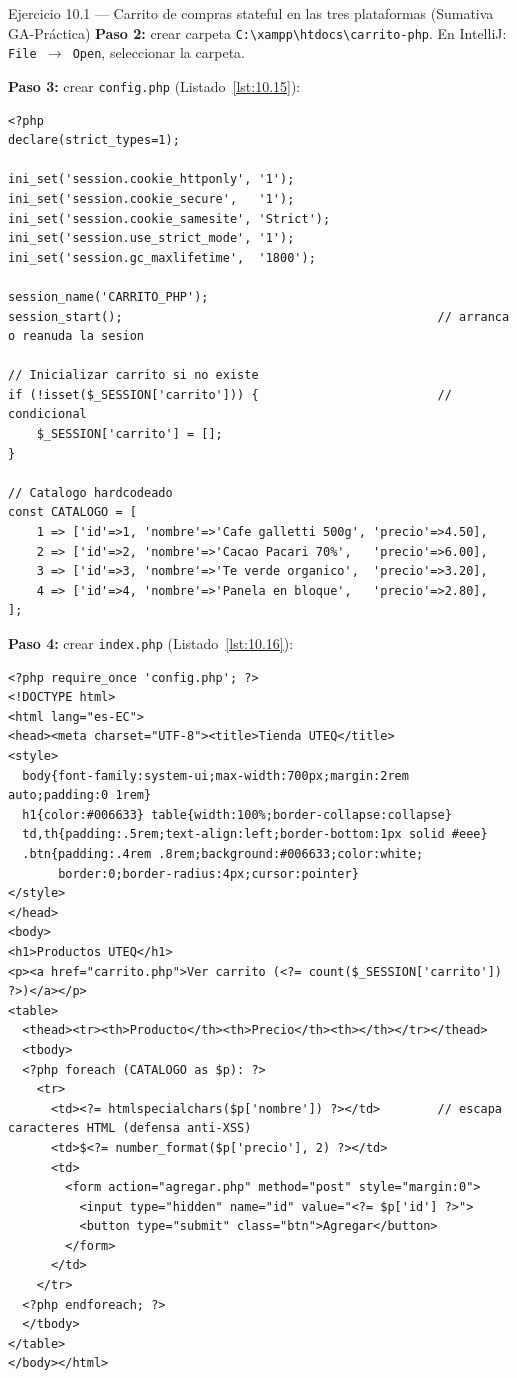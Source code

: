 \documentclass[11pt,a4paper,openany]{book}
\begin{document}
\begin{cajaejercicio}{Ejercicio 10.1 --- Carrito de compras stateful en las tres plataformas (Sumativa GA-Práctica)}
\textbf{Paso 2:} crear carpeta \texttt{C:\textbackslash{}xampp\textbackslash{}htdocs\textbackslash{}carrito-php}.
En IntelliJ: \texttt{File $\rightarrow$ Open}, seleccionar la carpeta.

\textbf{Paso 3:} crear \texttt{config.php} (Listado~\ref{lst:10.15}):

\begin{lstlisting}[style=php,caption={config.php},label=lst:10.15]
<?php
declare(strict_types=1);

ini_set('session.cookie_httponly', '1');
ini_set('session.cookie_secure',   '1');
ini_set('session.cookie_samesite', 'Strict');
ini_set('session.use_strict_mode', '1');
ini_set('session.gc_maxlifetime',  '1800');

session_name('CARRITO_PHP');
session_start();                                            // arranca o reanuda la sesion

// Inicializar carrito si no existe
if (!isset($_SESSION['carrito'])) {                         // condicional
    $_SESSION['carrito'] = [];
}

// Catalogo hardcodeado
const CATALOGO = [
    1 => ['id'=>1, 'nombre'=>'Cafe galletti 500g', 'precio'=>4.50],
    2 => ['id'=>2, 'nombre'=>'Cacao Pacari 70%',   'precio'=>6.00],
    3 => ['id'=>3, 'nombre'=>'Te verde organico',  'precio'=>3.20],
    4 => ['id'=>4, 'nombre'=>'Panela en bloque',   'precio'=>2.80],
];
\end{lstlisting}

\textbf{Paso 4:} crear \texttt{index.php} (Listado~\ref{lst:10.16}):

\begin{lstlisting}[style=php,caption={index.php},label=lst:10.16]
<?php require_once 'config.php'; ?>
<!DOCTYPE html>
<html lang="es-EC">
<head><meta charset="UTF-8"><title>Tienda UTEQ</title>
<style>
  body{font-family:system-ui;max-width:700px;margin:2rem auto;padding:0 1rem}
  h1{color:#006633} table{width:100%;border-collapse:collapse}
  td,th{padding:.5rem;text-align:left;border-bottom:1px solid #eee}
  .btn{padding:.4rem .8rem;background:#006633;color:white;
       border:0;border-radius:4px;cursor:pointer}
</style>
</head>
<body>
<h1>Productos UTEQ</h1>
<p><a href="carrito.php">Ver carrito (<?= count($_SESSION['carrito']) ?>)</a></p>
<table>
  <thead><tr><th>Producto</th><th>Precio</th><th></th></tr></thead>
  <tbody>
  <?php foreach (CATALOGO as $p): ?>
    <tr>
      <td><?= htmlspecialchars($p['nombre']) ?></td>        // escapa caracteres HTML (defensa anti-XSS)
      <td>$<?= number_format($p['precio'], 2) ?></td>
      <td>
        <form action="agregar.php" method="post" style="margin:0">
          <input type="hidden" name="id" value="<?= $p['id'] ?>">
          <button type="submit" class="btn">Agregar</button>
        </form>
      </td>
    </tr>
  <?php endforeach; ?>
  </tbody>
</table>
</body></html>
\end{lstlisting}


\end{cajaejercicio}
\end{document}

